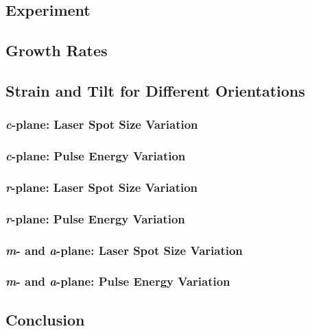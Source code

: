 \subsection{Experiment}
    
    \label{Sec:Results_3_Experiment}
\subsection{Growth Rates}
    
    \subsection{Strain and Tilt for Different Orientations}
        \subsubsection*{\textit{c}-plane: Laser Spot Size Variation}
            
        \subsubsection*{\textit{c}-plane: Pulse Energy Variation}
            
        \subsubsection*{\textit{r}-plane: Laser Spot Size Variation}
            
        \subsubsection*{\textit{r}-plane: Pulse Energy Variation}
            
            \clearpage
        \subsubsection*{\textit{m}- and \textit{a}-plane: Laser Spot Size Variation}
            
        \subsubsection*{\textit{m}- and \textit{a}-plane: Pulse Energy Variation}
            
\subsection{Conclusion}
    